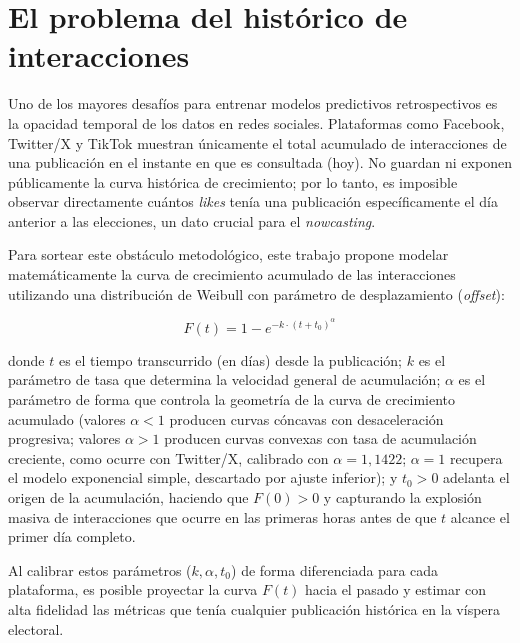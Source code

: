 \section{El problema del histórico de interacciones}

Uno de los mayores desafíos para entrenar modelos predictivos retrospectivos es la opacidad temporal de los datos en redes sociales. Plataformas como Facebook, Twitter/X y TikTok muestran únicamente el total acumulado de interacciones de una publicación en el instante en que es consultada (hoy). No guardan ni exponen públicamente la curva histórica de crecimiento; por lo tanto, es imposible observar directamente cuántos \textit{likes} tenía una publicación específicamente el día anterior a las elecciones, un dato crucial para el \textit{nowcasting}.

Para sortear este obstáculo metodológico, este trabajo propone modelar matemáticamente la curva de crecimiento acumulado de las interacciones utilizando una distribución de Weibull con parámetro de desplazamiento (\textit{offset}):

\begin{equation}
  F(t) = 1 - e^{-k \cdot (t + t_0)^{\alpha}}
  \label{eq:weibull}
\end{equation}

\noindent donde $t$ es el tiempo transcurrido (en días) desde la publicación; $k$ es el parámetro de tasa que determina la velocidad general de acumulación; $\alpha$ es el parámetro de forma que controla la geometría de la curva de crecimiento acumulado (valores $\alpha < 1$ producen curvas cóncavas con desaceleración progresiva; valores $\alpha > 1$ producen curvas convexas con tasa de acumulación creciente, como ocurre con Twitter/X, calibrado con $\alpha = 1{,}1422$; $\alpha = 1$ recupera el modelo exponencial simple, descartado por ajuste inferior); y $t_0 > 0$ adelanta el origen de la acumulación, haciendo que $F(0) > 0$ y capturando la explosión masiva de interacciones que ocurre en las primeras horas antes de que $t$ alcance el primer día completo.

Al calibrar estos parámetros ($k, \alpha, t_0$) de forma diferenciada para cada plataforma, es posible proyectar la curva $F(t)$ hacia el pasado y estimar con alta fidelidad las métricas que tenía cualquier publicación histórica en la víspera electoral.
